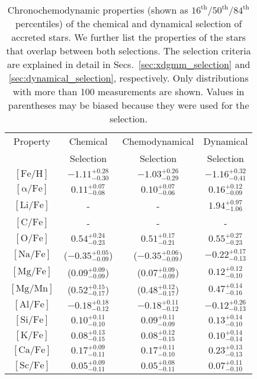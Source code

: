 \begingroup
\renewcommand{\arraystretch}{1.14}
\begin{table}
\centering
\caption{Chronochemodynamic properties (shown as $16^\text{th}$/$50^\text{th}$/$84^\text{th}$ percentiles) of the chemical and dynamical selection of accreted stars. We further list the properties of the stars that overlap between both selections. The selection criteria are explained in detail in Secs.~\ref{sec:xdgmm_selection} and \ref{sec:dynamical_selection}, respectively. Only distributions with more than 100 measurements are shown. Values in parentheses may be biased because they were used for the selection.}
\label{tab:chronochemodynamic_properties}
\begin{tabular}{cccc}
\hline
Property & Chemical & Chemodynamical & Dynamical \\
& Selection & Selection & Selection \\
\hline \hline
$\mathrm{[Fe/H]}$ & $-1.11_{-0.30}^{+0.28}$ & $-1.03_{-0.29}^{+0.26}$ & $-1.16_{-0.41}^{+0.32}$ \\
$\mathrm{[\alpha/Fe]}$ & $0.11_{-0.08}^{+0.07}$ & $0.10_{-0.06}^{+0.07}$ & $0.16_{-0.09}^{+0.12}$ \\
$\mathrm{[Li/Fe]}$ & - & - & $1.94_{-1.06}^{+0.97}$ \\
$\mathrm{[C/Fe]}$ & - & - & - \\
$\mathrm{[O/Fe]}$ & $0.54_{-0.23}^{+0.24}$ & $0.51_{-0.21}^{+0.17}$ & $0.55_{-0.23}^{+0.27}$ \\
$\mathrm{[Na/Fe]}$ & ($-0.35_{-0.09}^{+0.05}$) & ($-0.35_{-0.09}^{+0.06}$) & $-0.22_{-0.13}^{+0.17}$ \\
$\mathrm{[Mg/Fe]}$ & ($0.09_{-0.09}^{+0.09}$) & ($0.07_{-0.09}^{+0.09}$) & $0.12_{-0.10}^{+0.12}$ \\
$\mathrm{[Mg/Mn]}$ & ($0.52_{-0.17}^{+0.15}$) & ($0.48_{-0.17}^{+0.12}$) & $0.47_{-0.16}^{+0.14}$ \\
$\mathrm{[Al/Fe]}$ & $-0.18_{-0.12}^{+0.18}$ & $-0.18_{-0.12}^{+0.11}$ & $-0.12_{-0.13}^{+0.26}$ \\
$\mathrm{[Si/Fe]}$ & $0.10_{-0.10}^{+0.11}$ & $0.09_{-0.09}^{+0.11}$ & $0.13_{-0.10}^{+0.14}$ \\
$\mathrm{[K/Fe]}$ & $0.08_{-0.15}^{+0.13}$ & $0.08_{-0.15}^{+0.12}$ & $0.10_{-0.14}^{+0.14}$ \\
$\mathrm{[Ca/Fe]}$ & $0.17_{-0.11}^{+0.09}$ & $0.17_{-0.10}^{+0.11}$ & $0.23_{-0.13}^{+0.13}$ \\
$\mathrm{[Sc/Fe]}$ & $0.05_{-0.11}^{+0.09}$ & $0.05_{-0.11}^{+0.08}$ & $0.07_{-0.10}^{+0.11}$ \\

\end{tabular}
\end{table}
